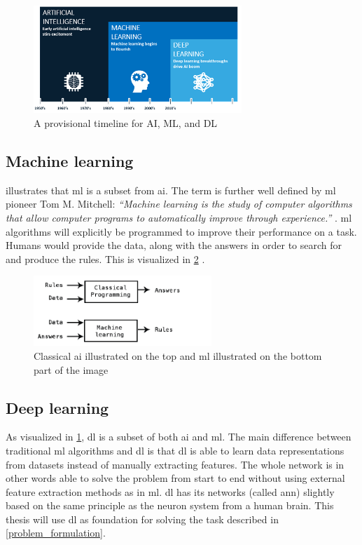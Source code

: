 \documentclass[USenglish]{ifimaster}  %
\begin{document}
\begin{figure}[ht]
    \centering
    \includegraphics[width=0.7\textwidth]{bilder/AI_ML_DL.png}
    \caption{A provisional timeline for AI, ML, and DL \cite{website:AI}}
    \label{fig:AI}
\end{figure}

\subsection{Machine learning}
 illustrates that \ac{ml} is a subset from \ac{ai}. The term is further well defined by \ac{ml} pioneer Tom M. Mitchell:
\newline
\newline
\textit{“Machine learning is the study of computer algorithms that allow computer programs to automatically improve through experience.”} \cite{tom_mitchell}.
\newline
\newline
\ac{ml} algorithms will explicitly be programmed to improve their performance on a task. Humans would provide the data, along with the answers in order to search for and produce the rules. This is visualized in \cref{fig:ml} \cite{Francois_Deep_learning_with_python}.
\begin{figure}[ht]
    \centering
    \includegraphics[width=0.6\textwidth]{bilder/ml.png}
    \caption{Classical \ac{ai} illustrated on the top and \ac{ml} illustrated on the bottom part of the image \cite{Francois_Deep_learning_with_python}}
    \label{fig:ml}
\end{figure}

\subsection{Deep learning}
As visualized in \cref{fig:AI}, \ac{dl} is a subset of both \ac{ai} and \ac{ml}. The main difference between traditional \ac{ml} algorithms and \ac{dl} is that \ac{dl} is able to learn data representations from datasets instead of manually extracting features. The whole network is in other words able to solve the problem from start to end without using external feature extraction methods as in \ac{ml}. \ac{dl} has its networks (called \ac{ann}) slightly based on the same principle as the neuron system from a human brain. This thesis will use \ac{dl} as foundation for solving the task described in \vref{problem_formulation}.
\end{document}
